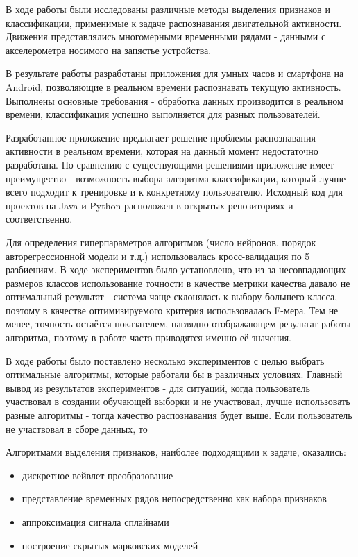 \conclusion

В ходе работы были исследованы различные методы выделения признаков и классификации, применимые к задаче распознавания двигательной активности. Движения представлялись многомерными временными рядами - данными с акселерометра носимого на запястье устройства.

В результате работы разработаны приложения для умных часов и смартфона на Android, позволяющие в реальном времени распознавать текущую активность. Выполнены основные требования - обработка данных производится в реальном времени, классификация успешно выполняется для разных пользователей. 

Разработанное приложение предлагает решение проблемы распознавания активности в реальном времени, которая на данный момент недостаточно разработана. По сравнению с существующими решениями приложение имеет преимущество - возможность выбора алгоритма классификации, который лучше всего подходит к тренировке и к конкретному пользователю. Исходный код для проектов на Java и Python расположен в открытых репозиториях \cite{repo_java} и \cite{repo_python} соответственно.

Для определения гиперпараметров алгоритмов (число нейронов, порядок авторегрессионной модели и т.д.) использовалась кросс-валидация по 5 разбиениям. В ходе экспериментов было установлено, что из-за несовпадающих размеров классов использование точности в качестве метрики качества давало не оптимальный результат - система чаще склонялась к выбору большего класса, поэтому в качестве оптимизируемого критерия использовалась F-мера. Тем не менее, точность остаётся показателем, наглядно отображающем результат работы алгоритма, поэтому в работе часто приводятся именно её значения.

В ходе работы было поставлено несколько экспериментов с целью выбрать оптимальные алгоритмы, которые работали бы в различных условиях. Главный вывод из результатов экспериментов - для ситуаций, когда пользователь участвовал в создании обучающей выборки и не участвовал, лучше использовать разные алгоритмы - тогда качество распознавания будет выше. Если пользователь не участвовал в сборе данных, то 

Алгоритмами выделения признаков, наиболее подходящими к задаче, оказались:
\begin{itemize}
\item дискретное вейвлет-преобразование
\item представление временных рядов непосредственно как набора признаков
\item аппроксимация сигнала сплайнами
\item построение скрытых марковских моделей
\end{itemize}


